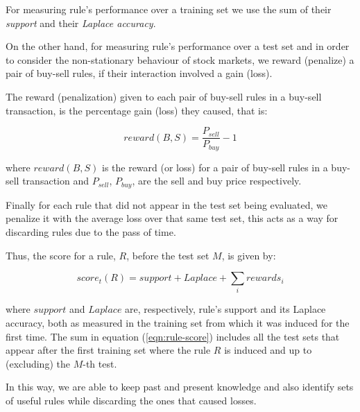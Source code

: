 \documentclass[preprint,3p,twocolumn]{elsarticle}
\begin{document}
For measuring rule's performance over a training set we use the sum of their \textit{support} and their \textit{Laplace accuracy}.

On the other hand, for measuring rule's performance over a test set and in order to consider the non-stationary behaviour of stock markets, we reward (penalize) a pair of buy-sell rules, if their interaction involved a gain (loss).

The reward (penalization) given to each pair of buy-sell rules in a buy-sell transaction, is the percentage gain (loss) they caused, that is:

\begin{equation} \label{eqn:reward}
reward(B,S) = \dfrac{P_{sell} }{P_{buy}} -1 
\end{equation}

where $reward(B,S)$ is the reward (or loss) for a pair of buy-sell rules in a buy-sell transaction and $P_{sell}$, $P_{buy}$, are the sell and buy price respectively.

Finally for each rule that did not appear in the test set being evaluated, we penalize it with the average loss over that same test set, this acts as a way for discarding rules due to the pass of time.

Thus, the score for a rule, $R$, before the test set $M$, is given by:

\begin{equation} \label{eqn:rule-score}
score_{t}(R) = support + Laplace + \sum_{i} rewards_{i}
\end{equation}

where $support$ and $Laplace$ are, respectively, rule's support and its Laplace accuracy, both as measured in the training set from which it was induced for the first time. The sum in equation (\ref{eqn:rule-score}) includes all the test sets that appear after the first training set where the rule $R$ is induced and up to (excluding) the $M$-th test.

In this way, we are able to keep past and present knowledge and also identify sets of useful rules while discarding the ones that caused losses.
\end{document}
